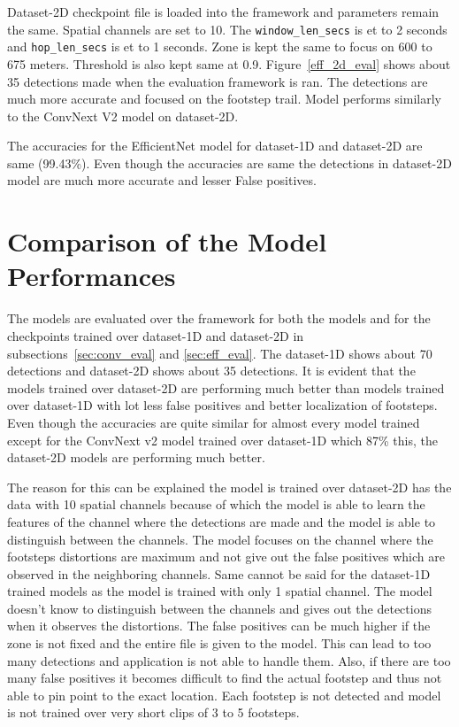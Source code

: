 Dataset-2D checkpoint file is loaded into the framework and parameters remain the same. Spatial channels are set to 10. The \texttt{window\_len\_secs} is et to 2 seconds and  \texttt{hop\_len\_secs} is et to 1 seconds. Zone is kept the same to focus on 600 to 675 meters. Threshold is also kept same at 0.9. Figure~\ref{eff_2d_eval} shows about 35 detections made when the evaluation framework is ran. The detections are much more accurate and focused on the footstep trail. Model performs similarly to the ConvNext V2 model on dataset-2D.

The accuracies for the EfficientNet model for dataset-1D and dataset-2D are same (99.43\%). Even though the accuracies are same the detections in dataset-2D model are much more accurate and lesser False positives. 

\section{Comparison of the Model Performances}
The models are evaluated over the framework for both the models and for the checkpoints trained over dataset-1D and dataset-2D in subsections~\ref{sec:conv_eval} and \ref{sec:eff_eval}. The dataset-1D shows about 70 detections and dataset-2D shows about 35 detections. It is evident that the models trained over dataset-2D are performing much better than models trained over dataset-1D with lot less false positives and better localization of footsteps. Even though the accuracies are quite similar for almost every model trained except for the ConvNext v2 model trained over dataset-1D which 87\% this, the dataset-2D models are performing much better. 

The reason for this can be explained the model is trained over dataset-2D has the data with 10 spatial channels because of which the model is able to learn the features of the channel where the detections are made and the model is able to distinguish between the channels. The model focuses on the channel where the footsteps distortions are maximum and not give out the false positives which are observed in the neighboring channels. Same cannot be said for the dataset-1D trained models as the model is trained with only 1 spatial channel. The model doesn't know to distinguish between the channels and gives out the detections when it observes the distortions. The false positives can be much higher if the zone is not fixed and the entire file is given to the model. This can lead to too many detections and application is not able to handle them. Also, if there are too many false positives it becomes difficult to find the actual footstep and thus not able to pin point to the exact location. Each footstep is not detected and model is not trained over very short clips of 3 to 5 footsteps.

